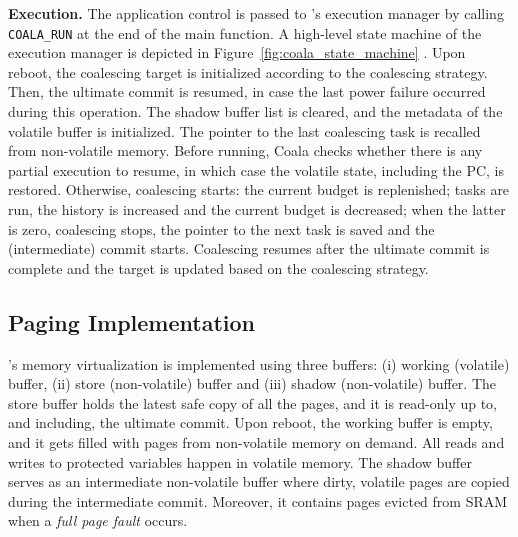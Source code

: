 \textbf{Execution.} The application control is passed to \sys's execution manager by calling \texttt{COALA\_RUN} at the end of the main function. A high-level state machine of the execution manager is depicted in Figure~\ref{fig:coala_state_machine} . Upon reboot, the coalescing target is initialized according to the coalescing strategy. Then, the ultimate commit is resumed, in case the last power failure occurred during this operation. The shadow buffer list is cleared, and the metadata of the volatile buffer is initialized. The pointer to the last coalescing task is recalled from non-volatile memory. Before running, Coala checks whether there is any partial execution to resume, in which case the volatile state, including the PC, is restored. Otherwise, coalescing starts: the current budget is replenished; tasks are run, the history is increased and the current budget is decreased; when the latter is zero, coalescing stops, the pointer to the next task is saved and the (intermediate) commit starts. Coalescing resumes after the ultimate commit is complete and the target is updated based on the coalescing strategy. 

\subsection{Paging Implementation}

\sys's memory virtualization is implemented using three buffers: (i) working (volatile) buffer, (ii) store (non-volatile) buffer and (iii) shadow (non-volatile) buffer. The store buffer holds the latest safe copy of all the pages, and it is read-only up to, and including, the ultimate commit. Upon reboot, the working buffer is empty, and it gets filled with pages from non-volatile memory on demand. All reads and writes to protected variables happen in volatile memory. The shadow buffer serves as an intermediate non-volatile buffer where dirty, volatile pages are copied during the intermediate commit. Moreover, it contains pages evicted from SRAM when a \emph{full page fault} occurs.

